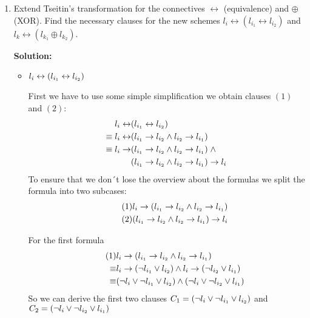 \documentclass[11pt,a4paper]{uebung}
\newcommand{\solution}[1]{\par {\bf Solution:}\\#1}
\begin{document}
\begin{enumerate}
\item Extend Tseitin's transformation for the connectives $\leftrightarrow$
  (equivalence) and $\oplus$ (XOR). Find the necessary clauses for the new schemes
  $l_i \leftrightarrow (l_{i_1} \leftrightarrow l_{i_2})$ and $l_k
  \leftrightarrow (l_{k_1} \oplus l_{k_2})$.
  
  \solution{    \begin{itemize}
    \item $l_{i} \leftrightarrow (l_{i_1} \leftrightarrow l_{i_2})$
      
      First we have to use some simple simplification we obtain clauses $(1)$ and $(2)$:
      \begin{align*}
        l_{i} \leftrightarrow& (l_{i_1} \leftrightarrow l_{i_2}) \\
        \equiv l_{i} \leftrightarrow& (l_{i_1} \rightarrow l_{i_2} \land l_{i_2} \rightarrow l_{i_1})\\
        \equiv l_{i} \rightarrow& (l_{i_1} \rightarrow l_{i_2} \land l_{i_2} \rightarrow l_{i_1})\; \land\\
        & (l_{i_1} \rightarrow l_{i_2} \land l_{i_2} \rightarrow l_{i_1}) \rightarrow l_{i}
      \end{align*}
      To ensure that we don´t lose the overview about the formulas we split the formula into two subcases:
        \begin{align*}
      \tag{1} l_{i} \rightarrow  (l_{i_1} \rightarrow l_{i_2} \land l_{i_2} \rightarrow l_{i_1}) \\
      \tag{2}  (l_{i_1} \rightarrow l_{i_2} \land l_{i_2} \rightarrow l_{i_1}) \rightarrow l_{i}
        \end{align*}

     For the first formula
      \begin{align*}
        \tag{1}&l_{i} \rightarrow (l_{i_1} \rightarrow l_{i_2} \land l_{i_2} \rightarrow l_{i_1})\\
        \equiv & l_{i} \rightarrow (\neg l_{i_1} \lor l_{i_2}) \land l_{i}\rightarrow (\neg l_{i_2} \lor l_{i_1}) \\
        \equiv &(\neg l_{i}\lor\neg l_{i_1} \lor l_{i_2}) \land (\neg l_{i}\lor\neg l_{i_2} \lor l_{i_1})
      \end{align*}
    So we can derive the first two clauses $C_{1}=(\neg l_{i}\lor\neg l_{i_1} \lor
    l_{i_2})$ and $C_{2}=(\neg l_{i}\lor\neg l_{i_2} \lor l_{i_1})$ 


\end{itemize}}
\end{enumerate}
\end{document}

